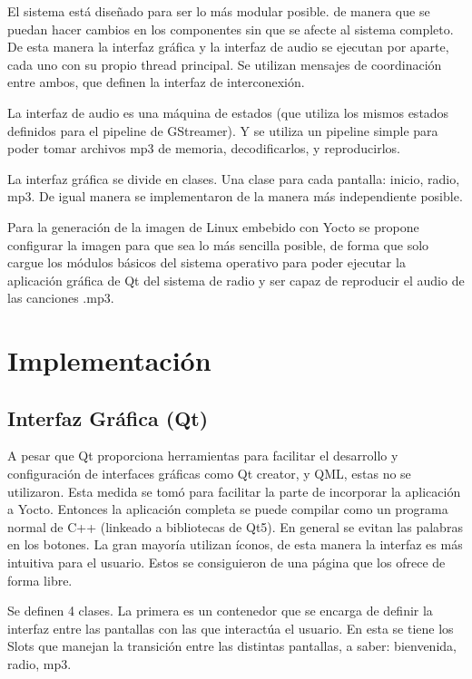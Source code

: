 El sistema está diseñado para ser lo más modular posible. de manera que se puedan hacer cambios en
los componentes sin que se afecte al sistema completo. De esta manera la interfaz gráfica y la
interfaz de audio se ejecutan por aparte, cada uno con su propio thread principal. Se utilizan
mensajes de coordinación entre ambos, que definen la interfaz de interconexión.

La interfaz de audio es una máquina de estados (que utiliza los mismos estados definidos para el
pipeline de GStreamer). Y se utiliza un pipeline simple para poder tomar archivos mp3 de memoria,
decodificarlos, y reproducirlos.

La interfaz gráfica se divide en clases. Una clase para cada pantalla: inicio, radio, mp3. De igual
manera se implementaron de la manera más independiente posible. 

Para la generación de la imagen de Linux embebido con Yocto se propone
configurar la imagen para que sea lo más sencilla posible, de forma que solo
cargue los módulos básicos del sistema operativo para poder ejecutar la
aplicación gráfica de Qt del sistema de radio y ser capaz de reproducir el audio
de las canciones .mp3.  


\section{Implementación}
\label{sec:implementation}
\subsection{Interfaz Gráfica (Qt)}
\label{sec:qt}

A pesar que Qt proporciona herramientas para facilitar el desarrollo y configuración de interfaces
gráficas como Qt creator, y QML, estas no se utilizaron. Esta medida se tomó para facilitar la parte
de incorporar la aplicación a Yocto. Entonces la aplicación completa se puede compilar como un
programa normal de C++ (linkeado a bibliotecas de Qt5). En general se evitan las palabras en los
botones. La gran mayoría utilizan íconos, de esta manera la interfaz es más intuitiva para el
usuario. Estos se consiguieron de una página que los ofrece de forma libre. %

Se definen 4 clases. La primera es un contenedor que se encarga de definir la interfaz entre las
pantallas con las que interactúa el usuario. En esta se tiene los Slots que manejan la transición
entre las distintas pantallas, a saber: bienvenida, radio, mp3.

